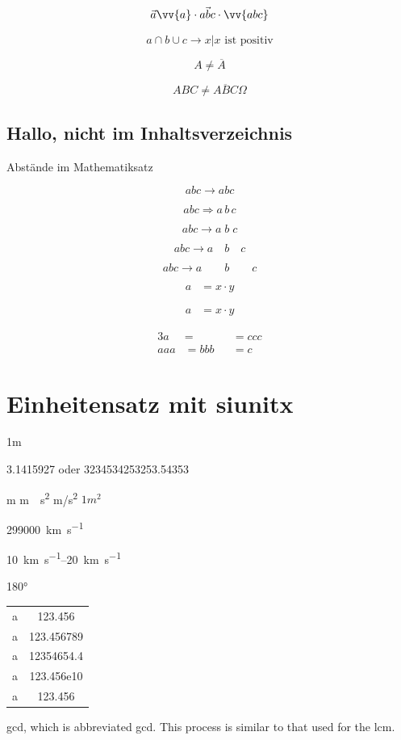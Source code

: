 \documentclass[ngerman,12pt]{scrreprt}
\begin{document}

\[ \vec{a} \vv{a}  \cdot \vec{abc} \cdot \vv{abc} \]

\[  a \cap b  \cup c \rightarrow {x | x \text{ ist positiv}} \]

\[ A \not= \overline{A} \]

\[ ABC \not= \overline{ABC}  \Omega \]

\section*{Hallo, nicht im Inhaltsverzeichnis}

Abstände im Mathematiksatz

\[ a b c \rightarrow abc \]

\[ a b c \Rightarrow a\,b\,c \]

\[ a b c \rightarrow a\;b\;c \]


\[ a b c \rightarrow a\quad b\quad c \]

\[ a b c \rightarrow a\qquad b\qquad c \]



\begin{align} 
a &= x \cdot y
\end{align}

\begin{align*} 
a &= x \cdot y
\end{align*}

\begin{alignat}{3} 
a     &=   &&= ccc \\
aaa &= bbb      &&= c
\end{alignat}

\chapter{Einheitensatz mit siunitx}

1m


\num{3,1415927} oder \num{3234534253253.54353}

\si{m}  \si{m \per \second^2} \si{m/\second^2}  $1m^2$

\SI{299000}{\kilo\meter\per\second}

\SIrange{10}{20}{\kilo\meter\per\second}

\ang{180}

\vspace*{2cm}
\begin{tabular}{rS}
a & 123.456 \\
a & 123.456789 \\
a & 12354654.4 \\
a & 123.456e10 \\
a & 123.456 \\
\end{tabular}

\acrlong{gcd}, which is abbreviated \acrshort{gcd}. This 
process is similar to that used for the \acrfull{lcm}.

\printglossary[type=\acronymtype]
\end{document}
